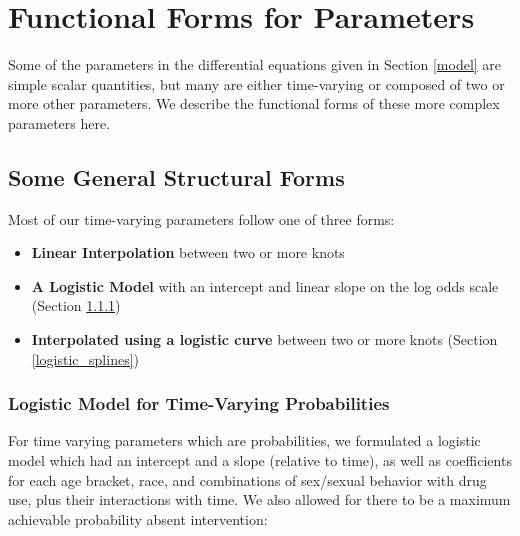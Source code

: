 \documentclass{article}
\begin{document}
\section{Functional Forms for Parameters} \label{functional_forms}

Some of the parameters in the differential equations given in Section \ref{model} are simple scalar quantities, but many are either time-varying or composed of two or more other parameters. We describe the functional forms of these more complex parameters here.

\subsection{Some General Structural Forms}

Most of our time-varying parameters follow one of three forms:
\begin{itemize}
	\item \textbf{Linear Interpolation} between two or more knots
	\item \textbf{A Logistic Model} with an intercept and linear slope on the log odds scale (Section \ref{logistic_model})
	\item \textbf{Interpolated using a logistic curve} between two or more knots (Section \ref{logistic_splines})
\end{itemize}

\subsubsection{Logistic Model for Time-Varying Probabilities} \label{logistic_model}
For time varying parameters which are probabilities, we formulated a logistic model which had an intercept and a slope (relative to time), as well as coefficients for each age bracket, race, and combinations of sex/sexual behavior with drug use, plus their interactions with time. We also allowed for there to be a maximum achievable probability absent intervention:
\end{document}
